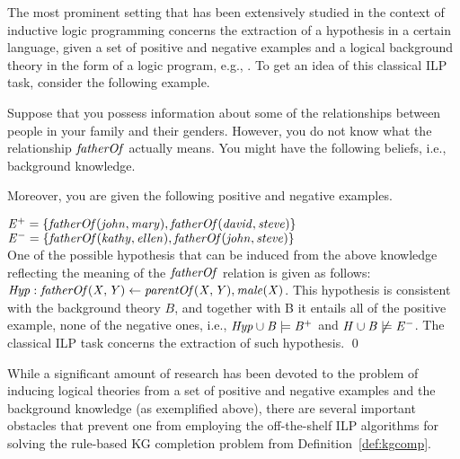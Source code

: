 The most prominent setting that has been extensively studied in the context of inductive logic programming concerns the extraction of a hypothesis in a certain language, given a set of positive and negative examples and a logical background theory in the form of a logic program, e.g., \cite{foil,golem,quickfoil}. To get an idea of this classical ILP task, consider the following example.

\begin{example}
Suppose that you possess information about some of the relationships between people in your family and their genders.
However, you do not know what the relationship $\mathit{fatherOf}$ actually means. 
You might have the following beliefs, i.e., background knowledge.
\smallskip

{}
\smallskip

Moreover, you are given the following positive and negative examples.
\smallskip

\noindent $\mathit{E^+=\{fatherOf(john, mary), fatherOf(david, steve)\}}$\\
$\mathit{E^-=\{fatherOf(kathy, ellen), fatherOf(john, steve)\}}$\\



One of the possible hypothesis that can be induced from the above knowledge reflecting the meaning of the $\mathit{fatherOf}$ relation is given as follows:\\
$\mathit{Hyp: fatherOf(X, Y)\leftarrow parentOf(X,Y), male(X)}$. This hypothesis is consistent with the background theory $B$, and together with B it entails all of the positive example, none of the negative ones, i.e., $\mathit{Hyp \cup B \models B^+}$ and $\mathit{H \cup B \not \models E^-}$. The classical ILP task concerns the extraction of such hypothesis. \qed
\end{example}

While a significant amount of research has been devoted to the problem of inducing logical theories from a set of positive and negative examples and the background knowledge (as exemplified above), there are several important obstacles that prevent one from employing the off-the-shelf ILP algorithms for solving the rule-based KG completion problem from Definition~\ref{def:kgcomp}. 

